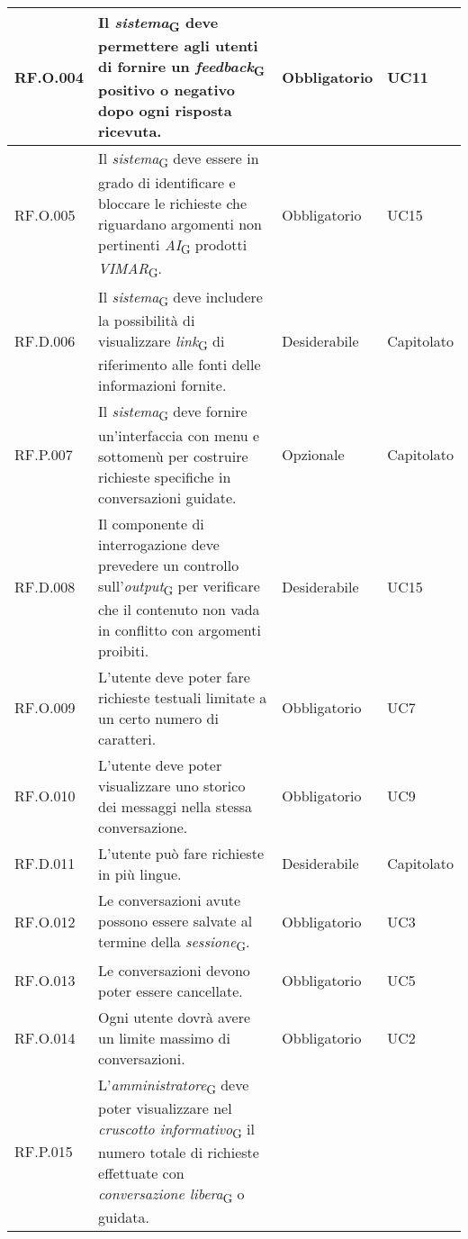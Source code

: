 \begin{table}[H]
\centering
    \begin{tabular}{|C{2.7cm}|L{7.2cm}|C{2.7cm}|C{2cm}|}
        \hline
        RF.O.004 & Il \textit{sistema}\textsubscript{G} deve permettere agli utenti di fornire un \textit{feedback}\textsubscript{G} positivo o negativo dopo ogni risposta ricevuta. & Obbligatorio & UC11 \\
        \hline
        RF.O.005 & Il \textit{sistema}\textsubscript{G} deve essere in grado di identificare e bloccare le richieste che riguardano argomenti non pertinenti \textit{AI}\textsubscript{G} prodotti \textit{VIMAR}\textsubscript{G}. & Obbligatorio & UC15 \\
        \hline
        RF.D.006 & Il \textit{sistema}\textsubscript{G} deve includere la possibilità di visualizzare \textit{link}\textsubscript{G} di riferimento alle fonti delle informazioni fornite. & Desiderabile & Capitolato \\
        \hline
        RF.P.007 & Il \textit{sistema}\textsubscript{G} deve fornire un'interfaccia con menu e sottomenù per costruire richieste specifiche in conversazioni guidate. & Opzionale & Capitolato\\
        \hline
        RF.D.008 & Il componente di interrogazione deve prevedere un controllo sull’\textit{output}\textsubscript{G}
        per verificare che il contenuto non vada in conflitto con argomenti proibiti. & Desiderabile & UC15 \\
        \hline
        RF.O.009 & L’utente deve poter fare richieste testuali limitate a un certo numero di caratteri. & Obbligatorio & UC7 \\
        \hline
        RF.O.010 & L’utente deve poter visualizzare uno storico dei messaggi nella stessa
        conversazione. & Obbligatorio & UC9 \\
        \hline
        RF.D.011 & L’utente può fare richieste in più lingue.
         & Desiderabile & Capitolato \\
         \hline
         RF.O.012 & Le conversazioni avute possono essere salvate al termine della \textit{sessione}\textsubscript{G}. & Obbligatorio & UC3 \\
        \hline
        RF.O.013 & Le conversazioni devono poter essere cancellate. & Obbligatorio & UC5 \\
        \hline
        RF.O.014 & Ogni utente dovrà avere un limite massimo di conversazioni.
         & Obbligatorio & UC2 \\
        \hline
        RF.P.015 & L'\textit{amministratore}\textsubscript{G} deve poter visualizzare nel \textit{cruscotto informativo}\textsubscript{G} il numero totale di richieste effettuate con \textit{conversazione libera}\textsubscript{G} o guidata.

\end{tabular}
\end{table}
